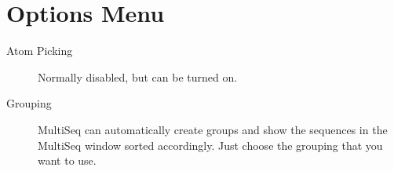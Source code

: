 \label{unit7}

\section{Options Menu}

\begin{description}
\item[Atom Picking] Normally disabled, but can be turned on.
\item[Grouping] MultiSeq can automatically create groups and show the
sequences in the MultiSeq window sorted accordingly.  Just choose the
grouping that you want to use.
\end{description}

